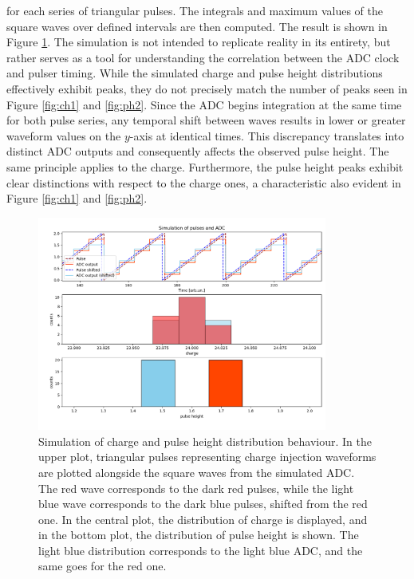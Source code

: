 for each series of triangular pulses. The integrals and maximum values of the square waves over defined intervals are then computed.
The result is shown in Figure \ref{fig:simsim}. The simulation is not intended to replicate reality in its entirety, 
but rather serves as a tool for understanding the correlation between the ADC clock and pulser timing. 
While the simulated charge and pulse height distributions effectively exhibit peaks, they do not precisely 
match the number of peaks seen in Figure \ref{fig:ch1} and \ref{fig:ph2}. Since the ADC begins integration 
at the same time for both pulse series, any temporal shift between waves results in lower or greater waveform values on the 
$y$-axis at identical times. This discrepancy translates into distinct ADC outputs and consequently affects the observed pulse height. 
The same principle applies to the charge. Furthermore, the pulse height peaks exhibit clear distinctions with respect to the charge ones, 
a characteristic also evident in Figure \ref{fig:ch1} and \ref{fig:ph2}.
\begin{figure}[!h]
  \centering
  \includegraphics[width=0.85\textwidth]{figures/png/pres.png}
  \caption{Simulation of charge and pulse height distribution behaviour. 
  In the upper plot, triangular pulses representing charge injection waveforms are 
  plotted alongside the square waves from the simulated ADC. The red wave corresponds to the dark red pulses, 
  while the light blue wave corresponds to the dark blue pulses, shifted from the red one. In the central plot, 
  the distribution of charge is displayed, and in the bottom plot, the distribution of pulse height is shown. 
  The light blue distribution corresponds to the light blue ADC, and the same goes for the red one.}
  \label{fig:simsim}
\end{figure}
